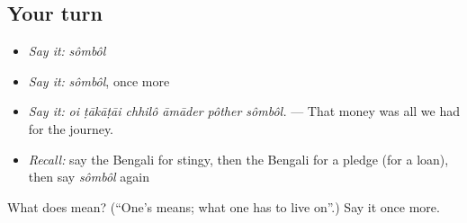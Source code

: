 \subsection*{Your turn}
\begin{itemize}
\raggedright
  \item \emph{Say it:} \emph{sômbôl}
  \item \emph{Say it:} \emph{sômbôl}, once more
  \item \emph{Say it:} \emph{oi ṭākāṭāi chhilô āmāder pôther sômbôl.} — That money was all we had for the journey.
  \item \emph{Recall:} say the Bengali for stingy, then the Bengali for a pledge (for a loan), then say \emph{sômbôl} again
\end{itemize}

\begin{tcolorbox}[breakable,colback=teal!4,colframe=teal!35!black,title={Before you move on}]
What does  mean? (\textquotedblleft{}One's means; what one has to live on\textquotedblright{}.) Say it once more.
\end{tcolorbox}
